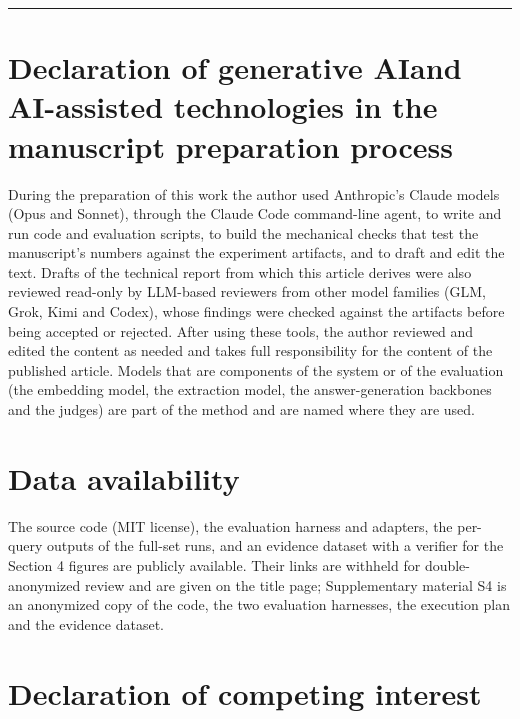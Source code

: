\documentclass[a4paper,fleqn]{cas-sc}
\begin{document}
\begin{center}\rule{0.5\linewidth}{0.5pt}\end{center}

\section*{Declaration of generative AIand AI-assisted technologies in the manuscript preparation process}

During the preparation of this work the author used Anthropic's Claude models (Opus and Sonnet), through the Claude Code command-line agent, to write and run code and evaluation scripts, to build the mechanical checks that test the manuscript's numbers against the experiment artifacts, and to draft and edit the text. Drafts of the technical report from which this article derives were also reviewed read-only by LLM-based reviewers from other model families (GLM, Grok, Kimi and Codex), whose findings were checked against the artifacts before being accepted or rejected. After using these tools, the author reviewed and edited the content as needed and takes full responsibility for the content of the published article. Models that are components of the system or of the evaluation (the embedding model, the extraction model, the answer-generation backbones and the judges) are part of the method and are named where they are used.

\section*{Data availability}

The source code (MIT license), the evaluation harness and adapters, the per-query outputs of the full-set runs, and an evidence dataset with a verifier for the Section 4 figures are publicly available. Their links are withheld for double-anonymized review and are given on the title page; Supplementary material S4 is an anonymized copy of the code, the two evaluation harnesses, the execution plan and the evidence dataset.

\section*{Declaration of competing interest}
\end{document}
